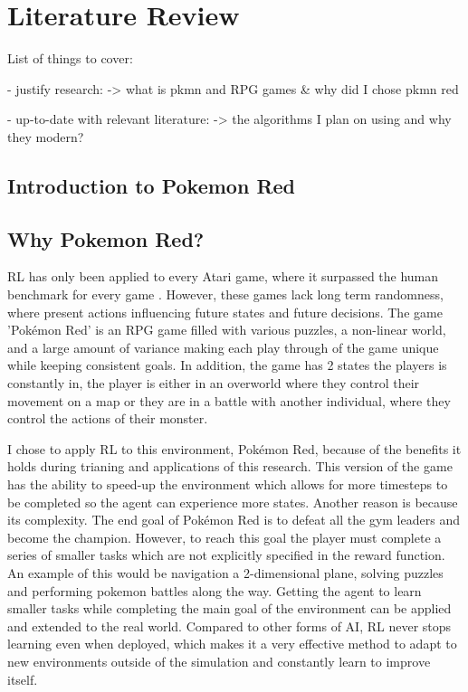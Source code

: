 \section{Literature Review}

List of things to cover:

- justify research: -> what is pkmn and RPG games \& why did I chose pkmn red

- up-to-date with relevant literature: -> the algorithms I plan on using and why they modern?

\subsection{Introduction to Pokemon Red}

\subsection{Why Pokemon Red?}

RL has only been applied to every Atari game, where it surpassed the human benchmark for every game \cite{brockman2016openai}. 
However, these games lack long term randomness, where present actions influencing future states and future decisions. The game 'Pokémon Red' is an RPG game filled with various puzzles, a non-linear world, and a large amount of variance making each play through of the game unique while keeping consistent goals. In addition, the game has 2 states the players is constantly in, the player is either in an 
overworld where they control their movement on a map or they are in a battle with another individual, where they control the actions 
of their monster.

I chose to apply RL to this environment, Pokémon Red, because of the benefits it holds during trianing and applications of this 
research. This version of the game has the ability to speed-up the environment which allows for more timesteps to be completed 
so the agent can experience more states. Another reason is because its complexity. The end goal of Pokémon Red is to defeat all the 
gym leaders and become the champion. However, to reach this goal the player must complete a series of smaller tasks which are not 
explicitly specified in the reward function. An example of this would be navigation a 2-dimensional plane, solving puzzles and
 performing pokemon battles along the way. Getting the agent to learn smaller tasks while completing the main goal of the environment 
 can be applied and extended to the real world. Compared to other forms of AI, RL never stops learning even when deployed, which makes
 it a very effective method to adapt to new environments outside of the simulation and constantly learn to improve itself. 

